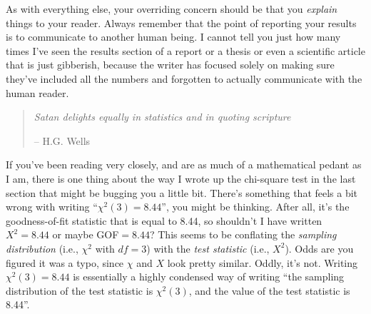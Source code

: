 As with everything else, your overriding concern should be that you {\it explain} things to your reader. Always remember that the point of reporting your results is to communicate to another human being. I cannot tell you just how many times I've seen the results section of a report or a thesis or even a scientific article that is just gibberish, because the writer has focused solely on making sure they've included all the numbers and forgotten to actually communicate with the human reader. 



\begin{quote}
{\it Satan delights equally in statistics and in quoting scripture} 

\hspace*{2cm} -- H.G. Wells
\end{quote}

\noindent
If you've been reading very closely, and are as much of a mathematical pedant as I am, there is one thing about the way I wrote up the chi-square test in the last section that might be bugging you a little bit. There's something that feels a bit wrong with writing ``$\chi^2(3) = 8.44$'', you might be thinking. After all, it's the goodness-of-fit statistic that is equal to 8.44, so shouldn't I have written $X^2 = 8.44$ or maybe GOF$=8.44$? This seems to be conflating the {\it sampling distribution} (i.e., $\chi^2$ with $df = 3$) with the {\it test statistic} (i.e., $X^2$). Odds are you figured it was a typo, since $\chi$ and $X$ look pretty similar. Oddly, it's not. Writing $\chi^2(3) = 8.44$ is essentially a highly condensed way of writing ``the sampling distribution of the test statistic is $\chi^2(3)$, and the value of the test statistic is 8.44''. 


